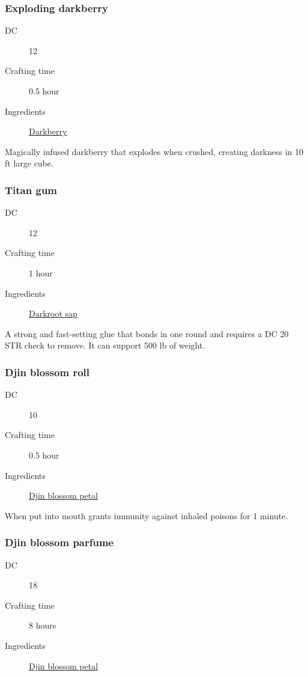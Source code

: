 \subsubsection{Exploding darkberry}
\label{Exploding darkberry}

\begin{description}
\item [DC] 12
\item [Crafting time] 0.5 hour
\item [Ingredients] \hyperref[Darkberry]{Darkberry}
\end{description}

Magically infused darkberry that explodes when crushed, creating darkness in 10 ft large cube.

\subsubsection{Titan gum}
\label{Titan gum}

\begin{description}
\item [DC] 12
\item [Crafting time] 1 hour
\item [Ingredients] \hyperref[Darkroot]{Darkroot sap}
\end{description}

A strong and fast-setting glue that bonds in one round and 
requires a DC 20 STR check to remove. It can support 500 lb of weight.

\subsubsection{Djin blossom roll}
\label{Djin blossom roll}

\begin{description}
\item [DC] 10
\item [Crafting time] 0.5 hour
\item [Ingredients] \hyperref[Djin Blossom]{Djin blossom petal}
\end{description}

When put into mouth grants immunity against inhaled poisons for 1 minute.

\subsubsection{Djin blossom parfume}

\begin{description}
\item [DC] 18
\item [Crafting time] 8 hours
\item [Ingredients] \hyperref[Djin Blossom]{Djin blossom petal}
\end{description}

